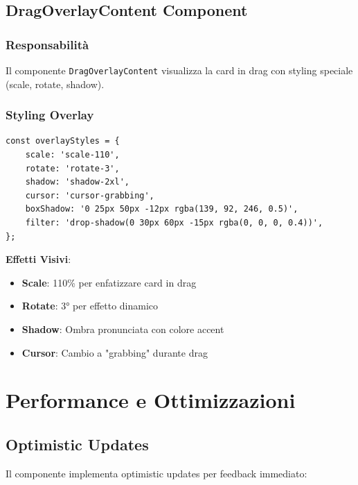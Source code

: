 \documentclass[11pt,a4paper]{article}
\begin{document}
\subsection{DragOverlayContent Component}

\subsubsection{Responsabilità}

Il componente \texttt{DragOverlayContent} visualizza la card in drag con styling speciale (scale, rotate, shadow).

\subsubsection{Styling Overlay}

\begin{lstlisting}[style=typescript, caption=Styling Drag Overlay]
const overlayStyles = {
    scale: 'scale-110',
    rotate: 'rotate-3',
    shadow: 'shadow-2xl',
    cursor: 'cursor-grabbing',
    boxShadow: '0 25px 50px -12px rgba(139, 92, 246, 0.5)',
    filter: 'drop-shadow(0 30px 60px -15px rgba(0, 0, 0, 0.4))',
};
\end{lstlisting}

\textbf{Effetti Visivi}:
\begin{itemize}
    \item \textbf{Scale}: 110\% per enfatizzare card in drag
    \item \textbf{Rotate}: 3° per effetto dinamico
    \item \textbf{Shadow}: Ombra pronunciata con colore accent
    \item \textbf{Cursor}: Cambio a "grabbing" durante drag
\end{itemize}


\section{Performance e Ottimizzazioni}

\subsection{Optimistic Updates}

Il componente implementa optimistic updates per feedback immediato:
\end{document}
